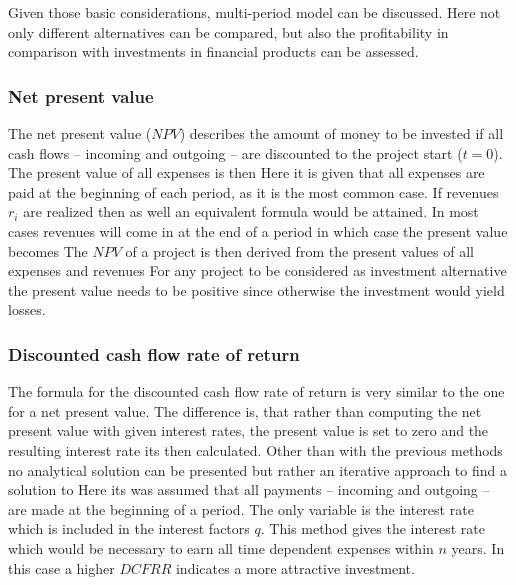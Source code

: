         Given those basic considerations, multi-period model can be discussed. Here not only different alternatives can be compared,
        but also the profitability in comparison with investments in financial products can be assessed.

        \subsubsection{Net present value}
            The net present value ($NPV$) describes the amount of money to be invested if all cash flows --
            incoming and outgoing -- are discounted to the project start ($t = 0$). The present value of
            all expenses is then
            Here it is given that all expenses are paid at the beginning of each period, as it is the most common case.
            If revenues $r_i$ are realized then as well an equivalent formula would be attained. In most cases
            revenues will come in at the end of a period in which case the present value becomes
            The $NPV$ of a project is then derived from the present values of all expenses and revenues
            For any project to be considered as investment alternative the present value needs to be positive since
            otherwise the investment would yield losses.

        \subsubsection{Discounted cash flow rate of return}
            The formula for the discounted cash flow rate of return is very similar to the one for a net present value.
            The difference is, that rather than computing the net present value with given interest rates, the present
            value is set to zero and the resulting interest rate its then calculated. Other than with the previous methods
            no analytical solution can be presented but rather an iterative approach to find a solution to
            Here its was assumed that all payments -- incoming and outgoing -- are made at the beginning of a period.
            The only variable is the interest rate which is included in the interest factors $q$. This method gives
            the interest rate which would be necessary to earn all time dependent expenses within $n$ years. In this
            case a higher $DCFRR$ indicates a more attractive investment.

